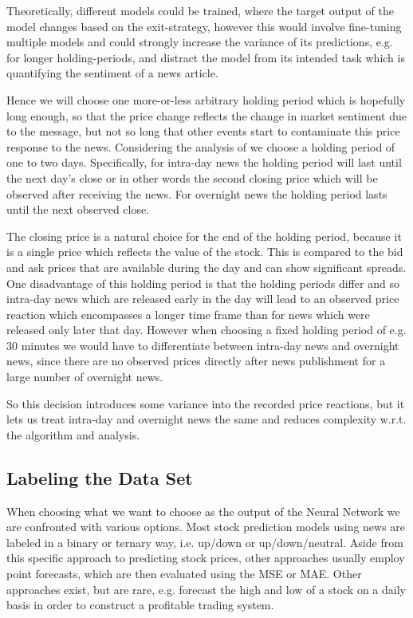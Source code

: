 \documentclass[12pt,a4paper]{article}
\begin{document}
	Theoretically, different models could be trained, where the target output of the model changes based on the exit-strategy, 
	however this would involve fine-tuning multiple models and could strongly increase the variance of its predictions, e.g. for longer holding-periods, 
	and distract the model from its intended task which is quantifying the sentiment of a news article.
	
	Hence we will choose one more-or-less arbitrary holding period which is hopefully long enough, so that the price change
	reflects the change in market sentiment due to the message, but not so long that other events start to contaminate this price response to the news.
	Considering the analysis of \cite{ke_predicting_2020} we choose a holding period of one to two days.
	Specifically, for intra-day news the holding period will last until the next day's close or in other words
	the second closing price which will be observed after receiving the news.
	For overnight news the holding period lasts until the next observed close.
	
	The closing price is a natural choice for the end of the holding period, because it is a single price which reflects the value of the stock. 
	This is compared to the bid and ask prices that are available during the day and can show significant spreads.
	One disadvantage of this holding period is that the holding periods differ and so intra-day news which are released
	early in the day will lead to an observed price reaction which encompasses a longer time frame than for news which were released only later that day.
	However when choosing a fixed holding period of e.g. 30 minutes we would have to differentiate between intra-day news and overnight news, since there are no observed prices directly after news publishment for a large number of overnight news.
	
	
	So this decision introduces some variance into the recorded price reactions, but it lets us treat intra-day and overnight news the same and reduces complexity w.r.t. the algorithm and analysis.
	
	\subsection{Labeling the Data Set}
	When choosing what we want to choose as the output of the Neural Network we are confronted with various options. 
	Most stock prediction models using news are labeled in a binary or ternary way, i.e. up/down or up/down/neutral.
	Aside from this specific approach to predicting stock prices,
	other approaches usually employ point forecasts, which are then evaluated using the \ac{MSE} or \ac{MAE}.
	Other approaches exist, but are rare, e.g. \cite{martinez_artificial_2009} forecast the high and low of a stock on a daily basis in order to construct a profitable trading system.
	
\end{document}
